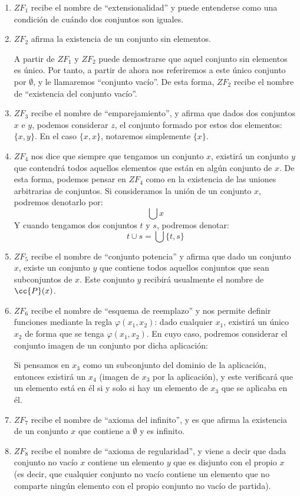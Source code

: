 \begin{enumerate}
    \item $ZF_1$ recibe el nombre de ``extensionalidad'' y puede entenderse como una condición de cuándo dos conjuntos son iguales.
    \item $ZF_2$ afirma la existencia de un conjunto sin elementos.

        A partir de $ZF_1$ y $ZF_2$ puede demostrarse que aquel conjunto sin elementos es único. Por tanto, a partir de ahora nos referiremos a este único conjunto por $\emptyset $, y le llamaremos ``conjunto vacío''. De esta forma, $ZF_2$ recibe el nombre de ``existencia del conjunto vacío''.
    \item $ZF_3$ recibe el nombre de ``emparejamiento'', y afirma que dados dos conjuntos $x$ e $y$, podemos considerar $z$, el conjunto formado por estos dos elementos: $\{x,y\}$. En el caso $\{x,x\}$, notaremos simplemente $\{x\}$.
    \item $ZF_4$ nos dice que siempre que tengamos un conjunto $x$, existirá un conjunto $y$ que contendrá todos aquellos elementos que están en algún conjunto de $x$. De esta forma, podemos pensar en $ZF_4$ como en la existencia de las uniones arbitrarias de conjuntos. 
        Si consideramos la unión de un conjunto $x$, podremos denotarlo por:
        \begin{equation*}
            \bigcup x
        \end{equation*}
        Y cuando tengamos dos conjuntos $t$ y $s$, podremos denotar:
        \begin{equation*}
            t\cup s = \bigcup \{t,s\}
        \end{equation*}
    \item $ZF_5$ recibe el nombre de ``conjunto potencia'' y afirma que dado un conjunto $x$, existe un conjunto $y$ que contiene todos aquellos conjuntos que sean subconjuntos de $x$. Este conjunto $y$ recibirá usualmente el nombre de $\cc{P}(x)$.
    \item $ZF_6$ recibe el nombre de ``esquema de reemplazo'' y nos permite definir funciones mediante la regla $\varphi(x_1,x_2)$: dado cualquier $x_1$, existirá un único $x_2$ de forma que se tenga $\varphi(x_1,x_2)$. En cuyo caso, podremos considerar el conjunto imagen de un conjunto por dicha aplicación:

        Si pensamos en $x_3$ como un subconjunto del dominio de la aplicación, entonces existirá un $x_4$ (imagen de $x_3$ por la aplicación), y este verificará que un elemento está en él si y solo si hay un elemento de $x_3$ que se aplicaba en él.
    \item $ZF_7$ recibe el nombre de ``axioma del infinito'', y es que afirma la existencia de un conjunto $x$ que contiene a $\emptyset $ y es infinito.
    \item $ZF_8$ recibe el nombre de ``axioma de regularidad'', y viene a decir que dada conjunto no vacío $x$ contiene un elemento $y$ que es disjunto con el propio $x$ (es decir, que cualquier conjunto no vacío contiene un elemento que no comparte ningún elemento con el propio conjunto no vacío de partida).


\end{enumerate}
